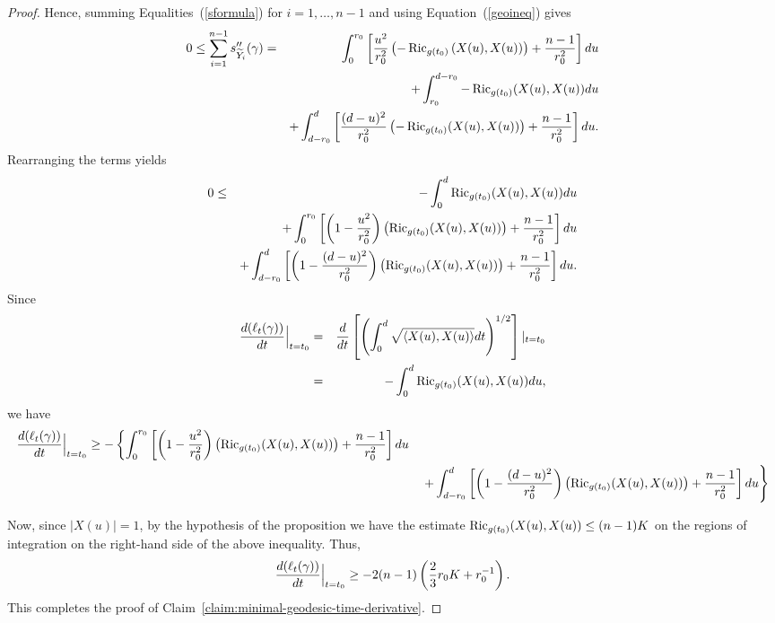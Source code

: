 \begin{proof}
Hence, summing Equalities~(\ref{sformula}) for $i=1,\ldots, n-1$ and
using Equation~(\ref{geoineq}) gives
\begin{eqnarray*}
0\le\sum_{i=1}^{n-1}s''_{\widetilde Y_i}(\gamma) & = &
\int_0^{r_0}\left[\frac{u^2}{r_0^2}\left(-\operatorname{Ric}_{g(t_0)}\left(X(u),X(u)\right)\right)
+\frac{n-1}{r_0^2}\right]du
\\
& & + \int_{r_0}^{d-r_0}-\operatorname{Ric}_{g(t_0)}(X(u),X(u))du
\\
 & & +\int_{d-r_0}^d\left[\frac{(d-u)^2}{r_0^2}
\left(-\operatorname{Ric}_{g(t_0)}(X(u),X(u))\right)+\frac{n-1}{r_0^2}\right]du.\end{eqnarray*}
Rearranging the terms yields
\begin{eqnarray*} 0 & \le & -\int_0^d \operatorname{Ric}_{g(t_0)}(X(u),X(u))du \\
& &+\int_0^{r_0}\left[\left(1-\frac{u^2}{r_0^2}\right)
\left(\operatorname{Ric}_{g(t_0)}(X(u),X(u))\right) +\frac{n-1}{r_0^2}\right]du\\
& & +\int_{d-r_0}^d
\left[\left(1-\frac{(d-u)^2}{r_0^2}\right)\left(\operatorname{Ric}_{g(t_0)}(X(u),X(u))\right)
+\frac{n-1}{r_0^2}\right]du.
\end{eqnarray*}
Since
\begin{eqnarray*}
\frac{d(\ell_t(\gamma))}{dt}\Bigl|_{t=t_0}\Bigr. & = &
\frac{d}{dt}\left[\left(\int_0^d\sqrt{\langle X(u),X(u)\rangle}dt\right)^{1/2}\right]|_{t=t_0} \\
& = & -\int_0^d \operatorname{Ric}_{g(t_0)}(X(u),X(u))du,
\end{eqnarray*}
we have
\begin{eqnarray*}
\frac{d(\ell_t(\gamma))}{dt}\Bigl|_{t=t_0}\Bigr.\ge
-\left\{\int_0^{r_0}\left[\left(1-\frac{u^2}{r_0^2}\right)\left(\operatorname{Ric}_{g(t_0)}(X(u),X(u))\right)
+\frac{n-1}{r_0^2}\right]du\right.
\\
& & \left. +\int_{d-r_0}^d
\left[\left(1-\frac{(d-u)^2}{r_0^2}\right)\left(\operatorname{Ric}_{g(t_0)}(X(u),X(u))\right)
+\frac{n-1}{r_0^2}\right]du\right\}
\end{eqnarray*}


Now, since $|X(u)|=1$, by the hypothesis of the proposition we have
the estimate $\operatorname{Ric}_{g(t_0)}(X(u),X(u))\le (n-1)K$ on the regions of
integration on the right-hand side of the above inequality. Thus,
\begin{eqnarray*}
\frac{d(\ell_t(\gamma))}{dt}\Bigl|_{t=t_0}\Bigr.\ge
-2(n-1)\left(\frac{2}{3}r_0K+r_0^{-1}\right).
\end{eqnarray*}
This completes the proof of Claim~\ref{claim:minimal-geodesic-time-derivative}.
\end{proof}

